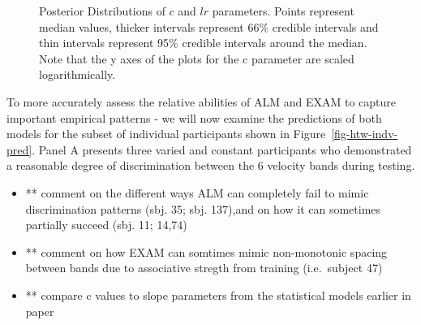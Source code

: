 \documentclass[
  letterpaper,
  DIV=11,
  numbers=noendperiod,
  oneside]{scrartcl}
\begin{document}
\begin{figure}


\caption{\label{fig-htw-post-dist}Posterior Distributions of \(c\) and
\(lr\) parameters. Points represent median values, thicker intervals
represent 66\% credible intervals and thin intervals represent 95\%
credible intervals around the median. Note that the y axes of the plots
for the c parameter are scaled logarithmically.}

\end{figure}%

To more accurately assess the relative abilities of ALM and EXAM to
capture important empirical patterns - we will now examine the
predictions of both models for the subset of individual participants
shown in Figure~\ref{fig-htw-indv-pred}. Panel A presents three varied
and constant participants who demonstrated a reasonable degree of
discrimination between the 6 velocity bands during testing.

\begin{itemize}
\item
  ** comment on the different ways ALM can completely fail to mimic
  discrimination patterns (sbj. 35; sbj. 137),and on how it can
  sometimes partially succeed (sbj. 11; 14,74)
\item
  ** comment on how EXAM can somtimes mimic non-monotonic spacing
  between bands due to associative stregth from training (i.e.~subject
  47)
\item
  ** compare c values to slope parameters from the statistical models
  earlier in paper
\end{itemize}
\end{document}
